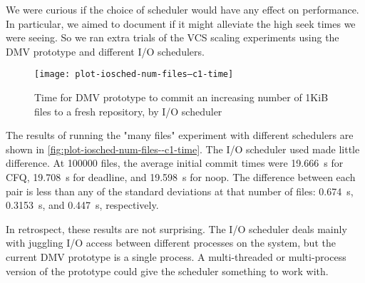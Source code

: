 We were curious if the choice of scheduler would have any effect on performance.
In particular, we aimed to document if it might alleviate the high seek times we
were seeing. So we ran extra trials of the VCS scaling experiments using the
\gls{DMV} prototype and different I/O schedulers.

\begin{figure}[]
    \caption{Time for DMV prototype to commit an increasing number of 1KiB files
    to a fresh repository, by I/O scheduler}
    \label{fig:plot-iosched-num-files--c1-time}
    \centering

    \explainlogsubfig

    \texttt{[image: plot-iosched-num-files--c1-time]}
\end{figure}

The results of running the "many files" experiment with different schedulers are
shown in \autoref{fig:plot-iosched-num-files--c1-time}. The I/O scheduler used
made little difference. At \num{100000} files, the average initial \gls{commit}
times were \SI{19.666}{\s} for CFQ, \SI{19.708}{\s} for deadline, and
\SI{19.598}{\s} for noop. The difference between each pair is less than any of
the standard deviations at that number of files: \SI{0.674}{\s},
\SI{0.3153}{\s}, and \SI{0.447}{\s}, respectively.

In retrospect, these results are not surprising. The I/O scheduler deals mainly
with juggling I/O access between different processes on the system, but the
current \gls{DMV} prototype is a single process. A multi-threaded or
multi-process version of the prototype could give the scheduler something to
work with.

%
